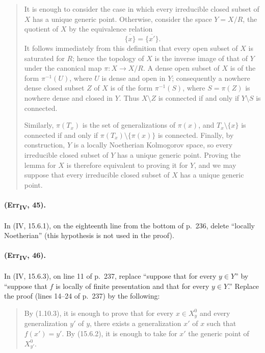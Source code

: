 \begin{quote}
It is enough to consider the case in which every irreducible closed
subset of $X$ has a unique generic point.  Otherwise, consider the
space $Y=X/R$, the quotient of $X$ by the equivalence relation
\[
 \overline{\{x\}}=\overline{\{x'\}}.
\]
It follows immediately from this definition that every open subset of
$X$ is saturated for $R$; hence the topology of $X$ is the inverse
image of that of $Y$ under the canonical map $\pi:X\to X/R$.  A dense
open subset of $X$ is of the form $\pi^{-1}(U)$, where $U$ is dense and
open in $Y$; consequently a nowhere dense closed subset $Z$ of $X$ is
of the form $\pi^{-1}(S)$, where $S=\pi(Z)$ is nowhere dense and closed
in $Y$.  Thus $X\setminus Z$ is connected if and only if
$Y\setminus S$ is connected.

Similarly, $\pi(T_x)$ is the set of generalizations of $\pi(x)$, and
$T_x\setminus\{x\}$ is connected if and only if
$\pi(T_x)\setminus\{\pi(x)\}$ is connected.  Finally, by construction,
$Y$ is a locally Noetherian Kolmogorov space, so every irreducible
closed subset of $Y$ has a unique generic point.  Proving the lemma for
$X$ is therefore equivalent to proving it for $Y$, and we may suppose
that every irreducible closed subset of $X$ has a unique generic point.
\end{quote}

\paragraph{(Err\textsubscript{IV}, 45).}
In (IV, 15.6.1), on the eighteenth line from the bottom of p.~236,
delete ``locally Noetherian'' (this hypothesis is not used in the
proof).

\paragraph{(Err\textsubscript{IV}, 46).}
In (IV, 15.6.3), on line 11 of p.~237, replace ``suppose that for every
$y\in Y$'' by ``suppose that $f$ is locally of finite presentation and
that for every $y\in Y$.''  Replace the proof (lines 14--24 of p.~237)
by the following:

\begin{quote}
By (1.10.3), it is enough to prove that for every $x\in X_y^0$ and
every generalization $y'$ of $y$, there exists a generalization $x'$ of
$x$ such that $f(x')=y'$.  By (15.6.2), it is enough to take for $x'$
the generic point of $X_{y'}^0$.
\end{quote}

